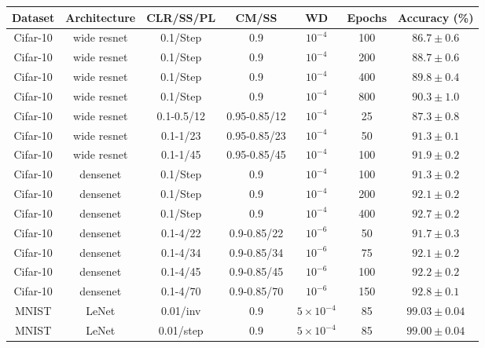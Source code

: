 \documentclass{article}
\begin{document}
\begin{table}[tb]
	\begin{center}
		\begin{tabular}{| c | c | c | c | c | c | c | }
			\hline
			Dataset & Architecture & CLR/SS/PL  & CM/SS & WD & Epochs & Accuracy (\%) \\ \hline
			Cifar-10 & wide resnet & 0.1/Step  & 0.9  & $10^{-4}$  &  100 & $ 86.7 \pm 0.6 $   \\ \hline
			Cifar-10 & wide resnet & 0.1/Step  & 0.9  & $10^{-4}$  &  200 & $ 88.7 \pm 0.6 $   \\ \hline
			Cifar-10 & wide resnet & 0.1/Step  & 0.9  & $10^{-4}$  &  400 & $ 89.8 \pm 0.4 $   \\ \hline
			Cifar-10 & wide resnet & 0.1/Step  & 0.9  & $10^{-4}$  &  800 & $ 90.3 \pm 1.0 $   \\ \hline
			Cifar-10 & wide resnet & 0.1-0.5/12  & 0.95-0.85/12 & $10^{-4}$ &  25 & $ 87.3 \pm 0.8 $   \\ \hline
			Cifar-10 & wide resnet & 0.1-1/23  & 0.95-0.85/23 & $10^{-4}$  &   50 & $ 91.3 \pm 0.1 $   \\ \hline
			Cifar-10 & wide resnet & 0.1-1/45  & 0.95-0.85/45 & $10^{-4}$  &  100 & $ 91.9 \pm 0.2 $   \\ \hline
			\hline   
			Cifar-10 & densenet & 0.1/Step  & 0.9 & $10^{-4}$  &  100 & $ 91.3 \pm 0.2 $   \\ \hline
			Cifar-10 & densenet & 0.1/Step  & 0.9 & $10^{-4}$  &  200 & $ 92.1 \pm 0.2 $   \\ \hline
			Cifar-10 & densenet & 0.1/Step  & 0.9 & $10^{-4}$  &  400 & $ 92.7 \pm 0.2 $   \\ \hline
			Cifar-10 & densenet & 0.1-4/22  & 0.9-0.85/22 & $10^{-6}$  &  50 & $ 91.7 \pm 0.3 $   \\ \hline
			Cifar-10 & densenet & 0.1-4/34  & 0.9-0.85/34 & $10^{-6}$  &  75 & $ 92.1 \pm 0.2 $   \\ \hline
			Cifar-10 & densenet & 0.1-4/45  & 0.9-0.85/45 & $10^{-6}$  &  100 & $ 92.2 \pm 0.2 $   \\ \hline
			Cifar-10 & densenet & 0.1-4/70  & 0.9-0.85/70 & $10^{-6}$  &  150 & $ 92.8 \pm 0.1 $   \\ \hline
			\hline   
			MNIST  & LeNet & 0.01/inv & 0.9  & $5 \times 10^{-4}$  &  85 & $ 99.03 \pm 0.04 $   \\ \hline
			MNIST  & LeNet & 0.01/step  & 0.9  & $5 \times 10^{-4}$  &  85 & $ 99.00 \pm 0.04 $   \\ \hline

\end{tabular}
\end{center}
\end{table}
\end{document}
